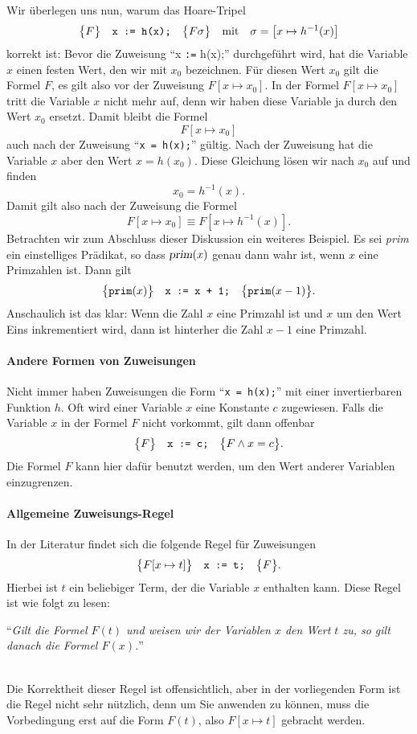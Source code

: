 Wir \"uberlegen uns nun, warum das Hoare-Tripel
\[ \bigl\{F\bigr\}\quad\texttt{x := h(x);}\quad\bigl\{F\sigma\bigr\} \quad \mathrm{mit} \quad \sigma = \bigl[x \mapsto h^{-1}(x)\bigr] \]
korrekt ist: Bevor die Zuweisung ``x \texttt{:=} h(x);'' durchgef\"uhrt wird,
hat die Variable $x$ einen festen Wert, den wir mit $x_0$ bezeichnen.  F\"ur diesen
Wert $x_0$ gilt die Formel $F$, es gilt also vor der Zuweisung $F[x \mapsto x_0]$.
In der Formel $F[x \mapsto x_0]$ tritt die Variable $x$ nicht mehr auf, denn wir haben
diese Variable ja durch den Wert $x_0$ ersetzt.  Damit bleibt die Formel
\[ F[x \mapsto x_0] \]
auch nach der Zuweisung  ``\texttt{x = h(x);}'' g\"ultig.  Nach der Zuweisung
hat die Variable $x$ aber den Wert $x = h(x_0)$.  Diese Gleichung l\"osen wir nach $x_0$
auf und finden 
\[ x_0 = h^{-1}(x). \]
Damit gilt also nach der Zuweisung die Formel 
\[ F[x \mapsto x_0] \equiv  F[x \mapsto h^{-1}(x)]. \]
Betrachten wir zum Abschluss dieser Diskussion ein weiteres Beispiel.  Es sei \textsl{prim}
ein einstelliges Pr\"adikat, so dass $\textsl{prim}(x)$ genau dann wahr ist, wenn $x$ eine
Primzahlen ist.
Dann gilt 
\[ \bigl\{\texttt{prim}(x)\bigr\}\quad\texttt{x := x + 1;}\quad\bigl\{\texttt{prim}(x-1)\bigr\}. \]
Anschaulich ist das klar: Wenn die Zahl $x$ eine Primzahl ist und $x$ um den Wert Eins
inkrementiert wird, dann ist hinterher die Zahl $x-1$ eine Primzahl.

\paragraph{Andere Formen von Zuweisungen}
Nicht immer haben Zuweisungen die Form ``\texttt{x = h(x);}'' mit einer invertierbaren
Funktion $h$.  Oft wird einer Variable $x$ eine Konstante $c$ zugewiesen.  Falls die
Variable $x$ in der Formel $F$ nicht vorkommt, gilt dann offenbar
\[ \bigl\{F\bigr\}\quad\texttt{x := c;}\quad\bigl\{F \wedge x = c\bigr\}. \]
Die Formel $F$ kann hier daf\"ur benutzt werden, um den Wert anderer Variablen einzugrenzen.

\paragraph{Allgemeine Zuweisungs-Regel}
In der Literatur findet sich die folgende Regel f\"ur Zuweisungen
\[ \bigl\{F[x \mapsto t]\bigr\}\quad\texttt{x := t;}\quad\bigl\{F\bigr\}. \]
Hierbei ist $t$ ein beliebiger Term, der die Variable $x$ enthalten kann.  Diese Regel ist
wie folgt zu lesen: 
\\[0.2cm]
\hspace*{1.3cm}
\begin{minipage}[c]{0.8\linewidth}
``\emph{Gilt die Formel $F(t)$ und weisen wir der Variablen $x$ den
        Wert $t$ zu, so gilt danach die Formel $F(x)$.}'' 
\end{minipage}
\\[0.2cm]
Die Korrektheit dieser Regel ist offensichtlich,
aber in der vorliegenden Form ist die Regel nicht sehr n\"utzlich, denn um Sie anwenden zu
k\"onnen, muss die Vorbedingung erst auf die Form $F(t)$, also $F[x \mapsto t]$ gebracht werden. 


